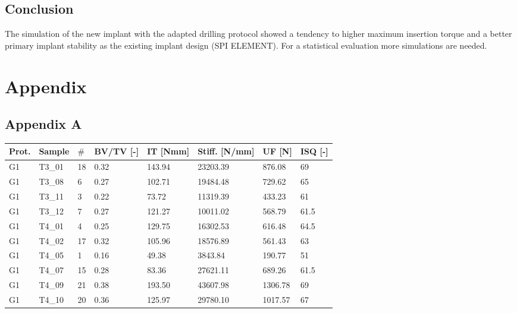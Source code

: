 \documentclass[12pt, a4paper, twoside]{report}
\begin{document}
\section{Conclusion}
%
The simulation of the new implant with the adapted drilling protocol showed a tendency to higher maximum insertion torque and a better primary implant stability as the existing implant design (SPI ELEMENT). For a statistical evaluation more simulations are needed.
%
\appendix
\chapter{Appendix}
\newpage
\section*{Appendix A}
\begin{table}[H]
\begin{tabular}{l|l|l|l|l|l|l|l}
Prot. & Sample & $\#$ & BV/TV {[}-{]} & IT {[}Nmm{]} & Stiff. {[}N/mm{]} & UF {[}N{]} & ISQ {[}-{]} \\ \hline
G1       & T3\_01 & 18 & 0.32          & 143.94            & 23203.39             & 876.08                 & 69          \\
G1       & T3\_08 & 6 & 0.27          & 102.71            & 19484.48             & 729.62                 & 65          \\
G1       & T3\_11 & 3 & 0.22          & 73.72             & 11319.39             & 433.23                 & 61          \\
G1       & T3\_12 & 7 & 0.27          & 121.27            & 10011.02             & 568.79                 & 61.5        \\
G1       & T4\_01 & 4 & 0.25          & 129.75            & 16302.53             & 616.48                 & 64.5        \\
G1       & T4\_02 & 17 & 0.32          & 105.96            & 18576.89             & 561.43                 & 63          \\
G1       & T4\_05 & 1 & 0.16          & 49.38             & 3843.84              & 190.77                 & 51          \\
G1       & T4\_07 & 15 & 0.28          & 83.36             & 27621.11             & 689.26                 & 61.5        \\
G1       & T4\_09 & 21 & 0.38          & 193.50            & 43607.98             & 1306.78                & 69          \\
G1       & T4\_10 & 20 & 0.36          & 125.97            & 29780.10             & 1017.57                & 67          \\

\end{tabular}
\end{table}
\end{document}
